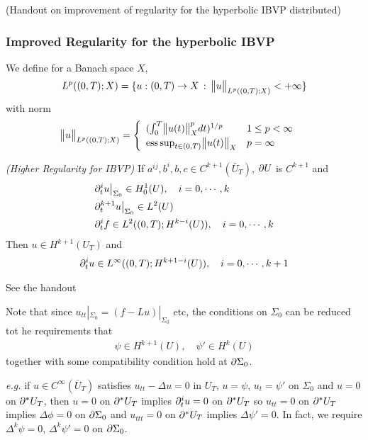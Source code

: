 \documentclass[12pt,a4paper]{report}
\newenvironment{proof}
{\begin{changemargin}{1cm}{0.5cm} 
	}%
	{\end{changemargin}
}
\begin{document}
(Handout on improvement of regularity for the hyperbolic IBVP distributed)

\subsubsection*{Improved Regularity for the hyperbolic IBVP}

We define for a Banach space $X$,
\begin{align*}
L^p((0,T); X) = \{ u : (0,T) \rightarrow X \,:\, \bigl\lVert u\bigr\rVert_{L^p((0,T);X)} < +\infty \}
\end{align*}
with norm
\begin{align*}
\bigl\lVert u\bigr\rVert_{L^p((0,T);X)} = \begin{cases}
\begin{array}{ll}
(\int_0^T \bigl\lVert u(t)\bigr\rVert_{X}^p dt)^{1/p} & 1\leq p < \infty \\
\text{ess}\,\text{sup}_{t\in (0,T)} \bigl\lVert u(t)\bigr\rVert_{X} &  p = \infty
\end{array}
\end{cases}
\end{align*}
\s

\thm \emph{(Higher Regularity for IBVP)} If $a^{ij}, b^i, b, c\in C^{k+1}(\bar{U}_T)$, $\partial U$ is $C^{k+1}$ and 
\begin{align*}
& \partial^i_t u \big|_{\Sigma_0} \in H_0^1(U), \quad i=0, \cdots,k \\
& \partial_t^{k+1} u \big|_{\Sigma_0} \in L^2(U) \\
& \partial_t^i f \in L^2((0,T) ; H^{k-i}(U)), \quad i=0, \cdots, k
\end{align*}
Then $u\in H^{k+1}(U_T)$ and
\begin{align*}
\partial_t^i u \in L^{\infty}((0,T) ; H^{k+1-i}(U)), \quad i=0, \cdots, k+1
\end{align*}
\begin{proof}
\pf See the handout
\end{proof}
\s

Note that since $u_{tt}|_{\Sigma_0} = (f-Lu)|_{\Sigma_0}$ etc, the conditions on $\Sigma_0$ can be reduced tot he requirements that
\begin{align*}
\psi \in H^{k+1}(U), \quad \psi' \in H^k(U)
\end{align*}
together with some compatibility condition hold at $\partial \Sigma_0$.
\s

\textit{e.g.} if $u\in C^{\infty}(\bar{U}_T)$ satisfies $u_{tt} - \Delta u =0$ in $U_T$, $u=\psi$, $u_t = \psi'$ on $\Sigma_0$ and $u=0$ on $\partial^* U_T$, then $u=0$ on $\partial^* U_T$ implies $\partial_t^i u=0$ on $\partial^* U_T$ so $u_{tt} =0$ on $\partial^* U_T$ implies $\Delta \phi =0$ on $\partial \Sigma_0$ and $u_{ttt} =0$ on $\partial^* U_T$ implies $\Delta \psi' =0$. In fact, we require $\Delta^k \psi =0$, $\Delta^k \psi' =0$ on $\partial \Sigma_0$.
\end{document}
